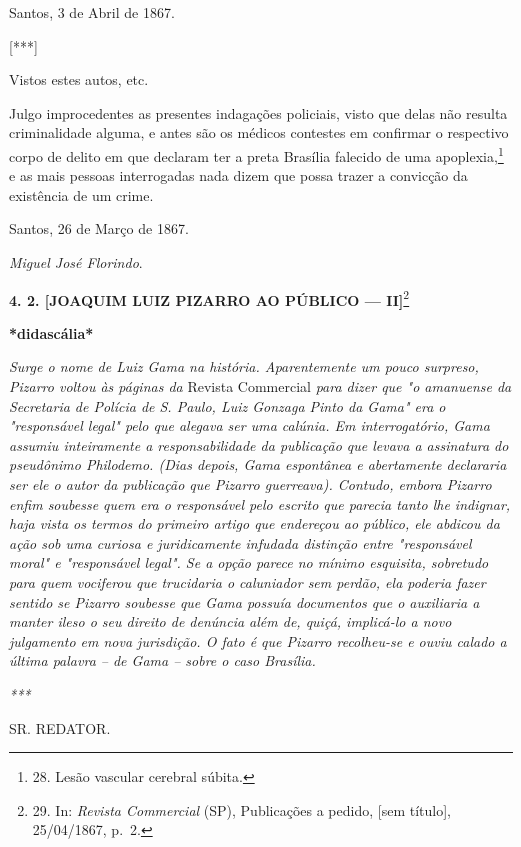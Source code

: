 Santos, 3 de Abril de 1867.

{[}***{]}

Vistos estes autos, etc.

Julgo improcedentes as presentes indagações policiais, visto que delas
não resulta criminalidade alguma, e antes são os médicos contestes em
confirmar o respectivo corpo de delito em que declaram ter a preta
Brasília falecido de uma apoplexia,\footnote{28. Lesão vascular cerebral
  súbita.} e as mais pessoas interrogadas nada dizem que possa trazer a
convicção da existência de um crime.

Santos, 26 de Março de 1867.

\emph{Miguel José Florindo}.

\textbf{4. 2. {[}JOAQUIM LUIZ PIZARRO AO PÚBLICO --- II{]}}\footnote{29.
  In: \emph{Revista Commercial} (SP), Publicações a pedido, {[}sem
  título{]}, 25/04/1867, p.~2.}

\textbf{*didascália*}

\emph{Surge o nome de Luiz Gama na história. Aparentemente um pouco
surpreso, Pizarro voltou às páginas da} Revista Commercial \emph{para
dizer que "o amanuense da Secretaria de Polícia de S. Paulo, Luiz
Gonzaga Pinto da Gama" era o "responsável legal" pelo que alegava ser
uma calúnia. Em interrogatório, Gama assumiu inteiramente a
responsabilidade da publicação que levava a assinatura do pseudônimo
Philodemo. (Dias depois, Gama espontânea e abertamente declararia ser
ele o autor da publicação que Pizarro guerreava). Contudo, embora
Pizarro enfim soubesse quem era o responsável pelo escrito que parecia
tanto lhe indignar, haja vista os termos do primeiro artigo que
endereçou ao público, ele abdicou da ação sob uma curiosa e
juridicamente infudada distinção entre "responsável moral" e
"responsável legal". Se a opção parece no mínimo esquisita, sobretudo
para quem vociferou que trucidaria o caluniador sem perdão, ela poderia
fazer sentido se Pizarro soubesse que Gama possuía documentos que o
auxiliaria a manter ileso o seu direito de denúncia além de, quiçá,
implicá-lo a novo julgamento em nova jurisdição. O fato é que Pizarro
recolheu-se e ouviu calado a última palavra -- de Gama -- sobre o caso
Brasília.}

\emph{***}

SR. REDATOR.

